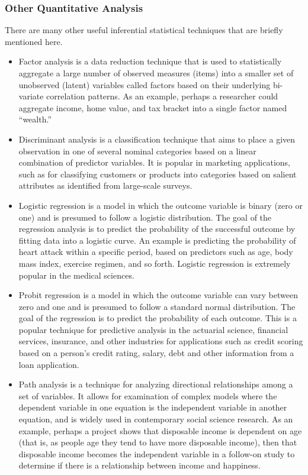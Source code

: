 \subsubsection{Other Quantitative Analysis}

There are many other useful inferential statistical techniques that are briefly mentioned here.

\begin{itemize}
	\item Factor analysis is a data reduction technique that is used to statistically aggregate a large number of observed measures (items) into a smaller set of unobserved (latent) variables called factors based on their underlying bi-variate correlation patterns. As an example, perhaps a researcher could aggregate income, home value, and tax bracket into a single factor named ``wealth.''

	\item Discriminant analysis is a classification technique that aims to place a given observation in one of several nominal categories based on a linear combination of predictor variables. It is popular in marketing applications, such as for classifying customers or products into categories based on salient attributes as identified from large-scale surveys.

	\item Logistic regression is a model in which the outcome variable is binary (zero or one) and is presumed to follow a logistic distribution. The goal of the regression analysis is to predict the probability of the successful outcome by fitting data into a logistic curve. An example is predicting the probability of heart attack within a specific period, based on predictors such as age, body mass index, exercise regimen, and so forth. Logistic regression is extremely popular in the medical sciences. 

	\item Probit regression is a model in which the outcome variable can vary between zero and one and is presumed to follow a standard normal distribution. The goal of the regression is to predict the probability of each outcome. This is a popular technique for predictive analysis in the actuarial science, financial services, insurance, and other industries for applications such as credit scoring based on a person's credit rating, salary, debt and other information from a loan application.

	\item Path analysis is a technique for analyzing directional relationships among a set of variables. It allows for examination of complex models where the dependent variable in one equation is the independent variable in another equation, and is widely used in contemporary social science research. As an example, perhaps a project shows that disposable income is dependent on age (that is, as people age they tend to have more disposable income), then that disposable income becomes the independent variable in a follow-on study to determine if there is a relationship between income and happiness.


\end{itemize}
